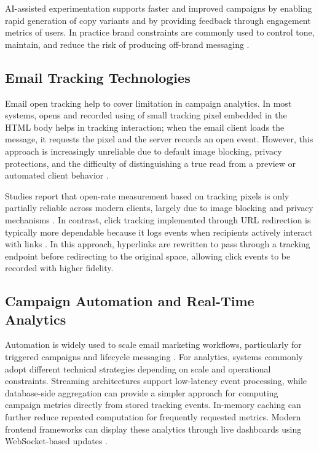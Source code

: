 \documentclass[12pt,journal,compsoc]{IEEEtran}
\begin{document}
AI-assisted experimentation supports faster and improved campaigns by enabling rapid generation of copy variants and by providing feedback through engagement metrics of users. In practice brand constraints are commonly used to control tone, maintain, and reduce the risk of producing off-brand messaging \cite{ref10,ref13,ref14}.

\subsection{Email Tracking Technologies}
Email open tracking help to cover limitation in campaign analytics. In most systems, opens and recorded using of small tracking pixel embedded in the HTML body helps in tracking interaction; when the email client loads the message, it requests the pixel and the server records an open event. However, this approach is increasingly unreliable due to default image blocking, privacy protections, and the difficulty of distinguishing a true read from a preview or automated client behavior \cite{ref15}.

Studies report that open-rate measurement based on tracking pixels is only partially reliable across modern clients, largely due to image blocking and privacy mechanisms \cite{ref15}. In contrast, click tracking implemented through URL redirection is typically more dependable because it logs events when recipients actively interact with links \cite{ref16}. In this approach, hyperlinks are rewritten to pass through a tracking endpoint before redirecting to the original space, allowing click events to be recorded with higher fidelity.

\subsection{Campaign Automation and Real-Time Analytics}
Automation is widely used to scale email marketing workflows, particularly for triggered campaigns and lifecycle messaging \cite{ref17}. For analytics, systems commonly adopt different technical strategies depending on scale and operational constraints. Streaming architectures support low-latency event processing, while database-side aggregation can provide a simpler approach for computing campaign metrics directly from stored tracking events. In-memory caching can further reduce repeated computation for frequently requested metrics. Modern frontend frameworks can display these analytics through live dashboards using WebSocket-based updates \cite{ref18}.
\end{document}
